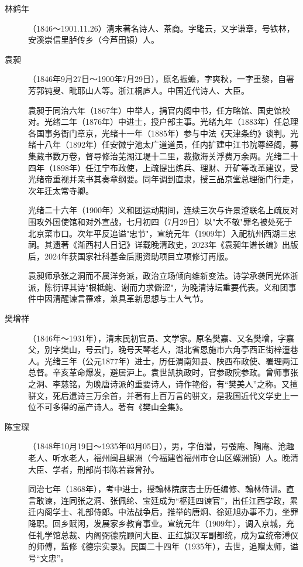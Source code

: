 \begin{description}
  \item[林鹤年] （1846～1901.11.26）清末著名诗人、茶商。字氅云，又字谦章，号铁林，安溪崇信里胪传乡（今芦田镇）人。
  \item[袁昶] （1846年9月27日～1900年7月29日），原名振蟾，字爽秋，一字重黎，自署芳郭钝叟、毗耶山人等。浙江桐庐人。中国近代诗人、大臣。\par
        袁昶于同治六年（1867年）中举人，捐官内阁中书，任方略馆、国史馆校对。光绪二年（1876年）中进士，授户部主事。光绪九年（1883年）任总理各国事务衙门章京，光绪十一年（1885年）参与中法《天津条约》谈判。光绪十八年（1892年）任安徽宁池太广道道员，任内扩建中江书院尊经阁，募集藏书数万卷，督导修治芜湖江堤十二里，裁撤海关浮费万余两。光绪二十四年（1898年）任江宁布政使，上疏提出练兵、理财、开矿等改革建议，受光绪帝重视并亲书其奏章纲要。同年调到直隶，授三品京堂总理衙门行走，次年迁太常寺卿。\par
        光绪二十六年（1900年）义和团运动期间，连续三次与许景澄联名上疏反对围攻外国使馆和对外宣战，七月初四（7月29日）以"大不敬"罪名被处死于北京菜市口。次年平反追谥"忠节"，宣统元年（1909年）入祀杭州西湖三忠祠。其遗著《渐西村人日记》详载晚清政史，2023年《袁昶年谱长编》出版后，2024年获国家社科基金后期资助项目立项修订再版。\par
        袁昶师承张之洞而不属洋务派，政治立场倾向维新变法。诗学承袭同光体浙派，陈衍评其诗"根柢鲍、谢而力求僻涩"，为晚清诗坛重要代表。义和团事件中因清醒谏言罹难，兼具革新思想与士人气节。
  \item[樊增祥] （1846年～1931年），清末民初官员、文学家。原名樊嘉、又名樊增，字嘉父，别字樊山，号云门，晚号天琴老人，湖北省恩施市六角亭西正街梓潼巷人。光绪三年（公元1877年）进士，历任渭南知县、陕西布政使、署理两江总督。辛亥革命爆发，避居沪上。袁世凯执政时，官参政院参政。曾师事张之洞、李慈铭，为晚唐诗派的重要诗人，诗作艳俗，有“樊美人”之称。又擅骈文，死后遗诗三万余首，并著有上百万言的骈文，是我国近代文学史上一位不可多得的高产诗人。著有《樊山全集》。
  \item[陈宝琛] （1848年10月19日～1935年03月05日），男，字伯潜，号弢庵、陶庵、沧趣老人、听水老人，福州闽县螺洲（今福建省福州市仓山区螺洲镇）人。晚清大臣、学者，刑部尚书陈若霖曾孙。\par
        同治七年（1868年），考中进士，授翰林院庶吉士历任编修、翰林侍讲。直言敢谏，连同张之洞、张佩纶、宝廷成为“枢廷四谏官”，出任江西学政，累迁内阁学士、礼部侍郎。中法战争后，推举的唐炯、徐延旭办事不力，坐罪降职。回乡赋闲，发展家乡教育事业。宣统元年（1909年），调入京城，充任礼学馆总裁、内阁弼德院顾问大臣、正红旗汉军副都统，成为宣统帝溥仪的师傅，监修《德宗实录》。民国二十四年（1935年），去世，追赠太师，谥号“文忠”。\par

\end{description}
